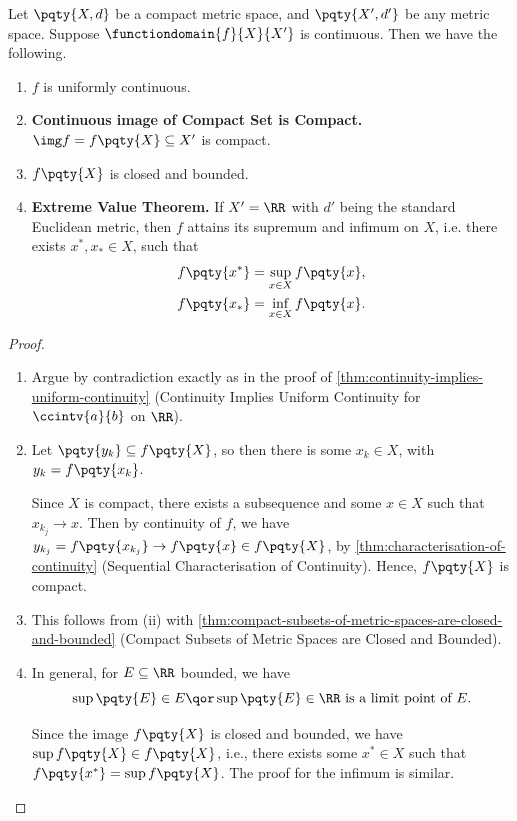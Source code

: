 \begin{theorem}
    \label{thm:uniform-continuity-on-compact-metric-spaces}%
    Let \(\pqty{X, d}\) be a compact metric space, and \(\pqty{X', d'}\) be any metric space. Suppose \(\functiondomain{f}{X}{X'}\) is continuous. Then we have the following.

    \begin{enumerate}[label=(\roman*)]
        \item \(f\) is uniformly continuous.
        \item \textbf{Continuous image of Compact Set is Compact.} \(\img f = f\pqty{X} \subseteq X'\) is compact.
        \item \(f\pqty{X}\) is closed and bounded.
        \item \textbf{Extreme Value Theorem.} If \(X' = \RR\) with \(d'\) being the standard Euclidean metric, then \(f\) attains its supremum and infimum on \(X\), i.e. there exists \(x^{\ast}, x_{\ast} \in X\), such that
        \begin{align*}
            f\pqty{x^{\ast}} & = \sup_{x \in X} f\pqty{x}, \\
            f\pqty{x_{\ast}} & = \inf_{x \in X} f\pqty{x}.
        \end{align*}
    \end{enumerate}
\end{theorem}

\begin{proof}
    \begin{enumerate}[label=(\roman*)]
        \item Argue by contradiction exactly as in the proof of \autoref{thm:continuity-implies-uniform-continuity} (Continuity Implies Uniform Continuity for \(\ccintv{a}{b}\) on \(\RR\)).

        \item Let \(\pqty{y_k} \subseteq f\pqty{X}\), so then there is some \(x_k \in X\), with \(y_k = f\pqty{x_k}\).

        Since \(X\) is compact, there exists a subsequence and some \(x \in X\) such that \(x_{k_j} \to x\). Then by continuity of \(f\), we have \(y_{k_j} = f\pqty{x_{k_j}} \to f\pqty{x} \in f\pqty{X}\), by \autoref{thm:characterisation-of-continuity} (Sequential Characterisation of Continuity). Hence, \(f\pqty{X}\) is compact.

        \item This follows from (ii) with \autoref{thm:compact-subsets-of-metric-spaces-are-closed-and-bounded} (Compact Subsets of Metric Spaces are Closed and Bounded).

        \item In general, for \(E \subseteq \RR\) bounded, we have
        \[
            \sup \pqty{E} \in E \qor \sup \pqty{E} \in \RR \text{ is a limit point of } E.
        \]
        
        Since the image \(f\pqty{X}\) is closed and bounded, we have \(\sup f\pqty{X} \in f\pqty{X}\), i.e., there exists some \(x^{\ast} \in X\) such that \(f\pqty{x^{\ast}} = \sup f\pqty{X}\). The proof for the infimum is similar.
    \end{enumerate}
\end{proof}

